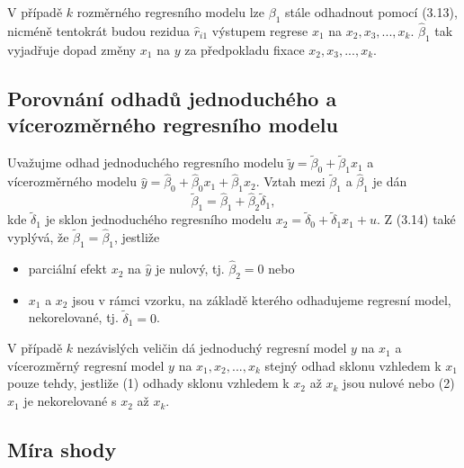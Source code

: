 V případě $k$ rozměrného regresního modelu lze $\beta_1$ stále odhadnout pomocí (3.13), nicméně tentokrát 
budou rezidua $\hat{r}_{i1}$ výstupem regrese $x_1$ na $x_2, x_3, ..., x_k$. $\hat{\beta}_1$ tak vyjadřuje dopad 
změny $x_1$ na $y$ za předpokladu fixace $x_2, x_3, ..., x_k$.

\subsection{Porovnání odhadů jednoduchého a vícerozměrného regresního modelu}

Uvažujme odhad jednoduchého regresního modelu $\tilde{y} = \tilde{\beta}_0 + \tilde{\beta}_1 x_1$ a 
vícerozměrného modelu $\hat{y} = \hat{\beta}_0 + \hat{\beta}_0 x_1 + \hat{\beta}_1 x_2$. Vztah mezi 
$\tilde{\beta}_1$ a $\hat{\beta}_1$ je dán
\begin{equation}
\tilde{\beta}_1 = \hat{\beta}_1 + \hat{\beta}_2 \tilde{\delta}_1,
\end{equation}
kde $\tilde{\delta}_1$ je sklon jednoduchého regresního modelu $x_2 = \tilde{\delta}_0 + \tilde{\delta}_1 x_1 + u$. Z (3.14) také 
vyplývá, že $\tilde{\beta}_1 = \hat{\beta}_1$, jestliže
\begin{itemize}
\item parciální efekt $x_2$ na $\hat{y}$ je nulový, tj. $\hat{\beta}_2 = 0$ nebo
\item $x_1$ a $x_2$ jsou v rámci vzorku, na základě kterého odhadujeme regresní model, nekorelované, tj. 
$\tilde{\delta}_1 = 0$.
\end{itemize}

V případě $k$ nezávislých veličin dá jednoduchý regresní model $y$ na $x_1$ a vícerozměrný regresní model 
$y$ na $x_1, x_2, ..., x_k$ stejný odhad sklonu vzhledem k $x_1$ pouze tehdy, jestliže (1) odhady sklonu vzhledem k 
$x_2$ až $x_k$ jsou nulové nebo (2) $x_1$ je nekorelované s $x_2$ až $x_k$.

\subsection{Míra shody}

